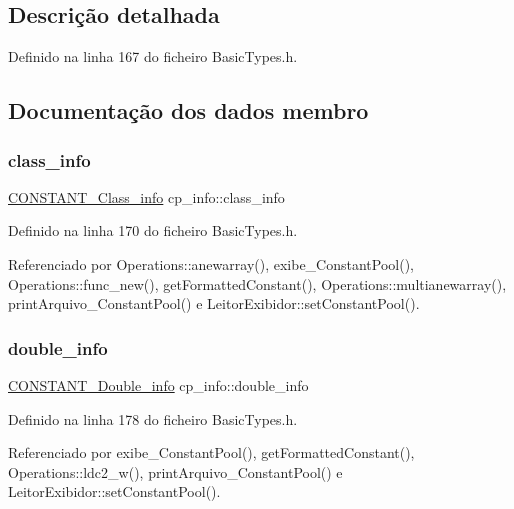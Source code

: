 \subsection{Descrição detalhada}


Definido na linha 167 do ficheiro Basic\+Types.\+h.



\subsection{Documentação dos dados membro}
\mbox{\label{structcp__info_add01ad1b269bc065f0863469cf8183b8}} 
\subsubsection{\texorpdfstring{class\+\_\+info}{class\_info}}
{\footnotesize\ttfamily \hyperlink{structCONSTANT__Class__info}{C\+O\+N\+S\+T\+A\+N\+T\+\_\+\+Class\+\_\+info} cp\+\_\+info\+::class\+\_\+info}



Definido na linha 170 do ficheiro Basic\+Types.\+h.



Referenciado por Operations\+::anewarray(), exibe\+\_\+\+Constant\+Pool(), Operations\+::func\+\_\+new(), get\+Formatted\+Constant(), Operations\+::multianewarray(), print\+Arquivo\+\_\+\+Constant\+Pool() e Leitor\+Exibidor\+::set\+Constant\+Pool().

\mbox{\label{structcp__info_aa76301d1853395d7594520988422c3d0}} 
\subsubsection{\texorpdfstring{double\+\_\+info}{double\_info}}
{\footnotesize\ttfamily \hyperlink{structCONSTANT__Double__info}{C\+O\+N\+S\+T\+A\+N\+T\+\_\+\+Double\+\_\+info} cp\+\_\+info\+::double\+\_\+info}



Definido na linha 178 do ficheiro Basic\+Types.\+h.



Referenciado por exibe\+\_\+\+Constant\+Pool(), get\+Formatted\+Constant(), Operations\+::ldc2\+\_\+w(), print\+Arquivo\+\_\+\+Constant\+Pool() e Leitor\+Exibidor\+::set\+Constant\+Pool().


